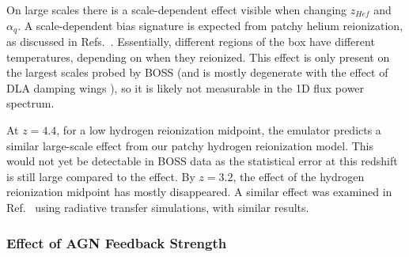 \documentclass[a4paper,11pt]{article}
\begin{document}
On large scales there is a scale-dependent effect visible when changing $z_{Hef}$ and $\alpha_q$. A scale-dependent bias signature is expected from patchy helium reionization, as discussed in Refs.~\cite{Pontzen:2014a, Pontzen:2014b,  Gontcho:2014}. Essentially, different regions of the box have different temperatures, depending on when they reionized. This effect is only present on the largest scales probed by BOSS (and is mostly degenerate with the effect of DLA damping wings \cite{Rogers:2017}), so it is likely not measurable in the 1D flux power spectrum. %

At $z=4.4$, for a low hydrogen reionization midpoint, the emulator predicts a similar large-scale effect from our patchy hydrogen reionization model. This would not yet be detectable in BOSS data as the statistical error at this redshift is still large compared to the effect. By $z=3.2$, the effect of the hydrogen reionization midpoint has mostly disappeared. A similar effect was examined in Ref.~\cite{Molaro:2022} using radiative transfer simulations, with similar results.

\subsubsection{Effect of AGN Feedback Strength}
\label{sec:agnresult}
\end{document}
